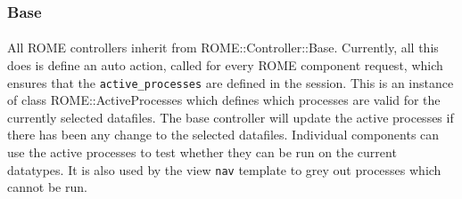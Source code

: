 \subsubsection{Base}
\label{sec:controller_base}

\paragraph{}
All ROME controllers inherit from ROME::Controller::Base. Currently, all this does is define an auto action, called for every ROME component request, which ensures that the \texttt{active\_processes} are defined in the session. This is an instance of class ROME::ActiveProcesses which defines which processes are valid for the currently selected datafiles. The base controller will update the active processes if there has been any change to the selected datafiles. Individual components can use the active processes to test whether they can be run on the current datatypes. It is also used by the view \texttt{nav} template to grey out processes which cannot be run.